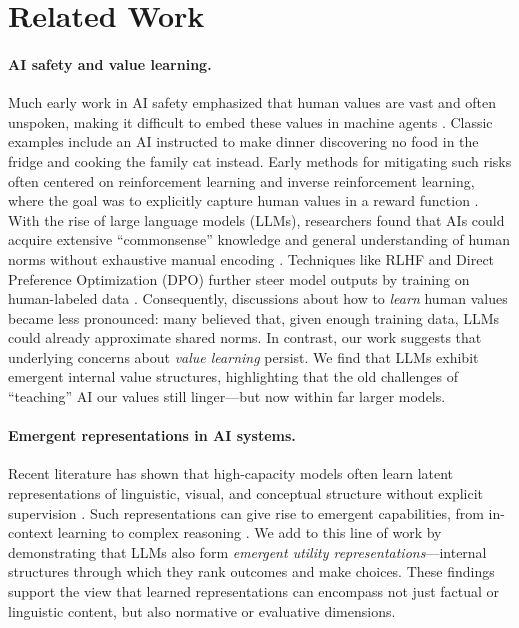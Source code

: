 \section{Related Work}

\paragraph{AI safety and value learning.} Much early work in AI safety emphasized that human values are vast and often unspoken, making it difficult to embed these values in machine agents \citep[e.g.,][]{russell2022human, nick2014superintelligence}. Classic examples include an AI instructed to make dinner discovering no food in the fridge and cooking the family cat instead. Early methods for mitigating such risks often centered on reinforcement learning and inverse reinforcement learning, where the goal was to explicitly capture human values in a reward function \citep{ng2000algorithms, hadfield2016cooperative}. With the rise of large language models (LLMs), researchers found that AIs could acquire extensive ``commonsense'' knowledge and general understanding of human norms without exhaustive manual encoding \citep{hendrycks2020aligning}. Techniques like RLHF and Direct Preference Optimization (DPO) further steer model outputs by training on human-labeled data \citep{ouyang2022training, rafailov2024direct}. Consequently, discussions about how to \emph{learn} human values became less pronounced: many believed that, given enough training data, LLMs could already approximate shared norms. In contrast, our work suggests that underlying concerns about \emph{value learning} persist. We find that LLMs exhibit emergent internal value structures, highlighting that the old challenges of ``teaching'' AI our values still linger—but now within far larger models.
\vspace{-5pt}
\paragraph{Emergent representations in AI systems.} Recent literature has shown that high-capacity models often learn latent representations of linguistic, visual, and conceptual structure without explicit supervision \citep{zou2023representation, burns2022discovering}. Such representations can give rise to emergent capabilities, from in-context learning to complex reasoning \citep{brown2020language, schick2020s, park2024iclr}. We add to this line of work by demonstrating that LLMs also form \emph{emergent utility representations}—internal structures through which they rank outcomes and make choices. These findings support the view that learned representations can encompass not just factual or linguistic content, but also normative or evaluative dimensions.
\vspace{-5pt}
